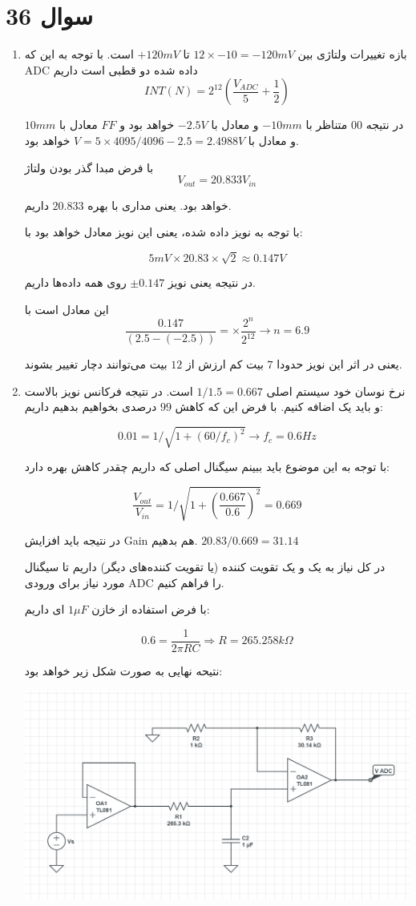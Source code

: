 \documentclass[12pt]{article}
\begin{document}
\section*{سوال 36}

\begin{enumerate}[label = \harfi*)]
	\item
بازه تغییرات ولتاژی بین
$12 \times -10 = -120 mV$
تا
$+120mV$
است. با توجه به این که ADC داده شده دو قطبی است داریم
$$INT(N) = 2^{12} (\frac{V_{ADC}}{5} + \frac{1}{2})$$

در نتیجه $00$ متناظر با $-10mm$ و معادل با $-2.5 V$ خواهد بود و $FF$ معادل با $10mm$ و معادل با
$V = 5 \times 4095 / 4096 - 2.5 = 2.4988 V$
خواهد بود.

با فرض مبدا گذر بودن ولتاژ
$$V_{out} = 20.833 V_{in}$$

خواهد بود. یعنی مداری با بهره $20.833$ داریم.

با توجه به نویز داده شده، یعنی این نویز معادل خواهد بود با:

$$5 mV \times 20.83 \times \sqrt{2} \approx0.147 V$$

در نتیجه یعنی نویز $\pm 0.147$ روی همه داده‌ها داریم.

این معادل است با
$$\frac{0.147}{(2.5 - (-2.5))} =  \times \frac{2^n}{2^12} \rightarrow n=6.9$$

یعنی در اثر این نویز حدودا $7$ بیت کم ارزش از $12$ بیت می‌توانند دچار تغییر بشوند. 

\item

نرخ نوسان خود سیستم اصلی $1/1.5 = 0.667$ است. در نتیجه فرکانس نویز بالاست و باید یک  اضافه کنیم. با فرض این که کاهش $99$ درصدی بخواهیم بدهیم داریم:

$$0.01 = 1/\sqrt{1+(60/f_c)^2}\rightarrow f_c = 0.6 Hz$$

با توجه به این موضوع باید ببینم سیگنال اصلی که داریم چقدر کاهش بهره دارد:

$$\frac{V_{out}}{V_{in}} = 1/\sqrt{1+(\frac{0.667}{0.6})^2} = 0.669$$

در نتیجه باید افزایش Gain هم بدهیم.
$20.83/0.669 = 31.14$

در کل نیاز به یک  و یک تقویت کننده  (یا تقویت کننده‌های دیگر) داریم تا سیگنال مورد نیاز برای ورودی ADC را فراهم کنیم.

با فرض استفاده از خازن $1\mu F$ ای داریم:

$$0.6 = \frac{1}{2 \pi R C} \Rightarrow R = 265.258 k\Omega$$

نتیحه نهایی به صورت شکل زیر خواهد بود:


\begin{center}
	\includegraphics[width = 0.5 \textwidth]{images/5.png}
\end{center}

\end{enumerate}
\end{document}
